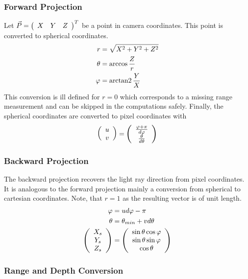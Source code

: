 \subsubsection*{Forward Projection}

Let $\vec{P} = \left(\begin{array}{ccc} X & Y & Z \end{array}\right)^T$ be a point in camera coordinates.
This point is converted to spherical coordinates.
\begin{equation}
\begin{aligned}
    r      &= \sqrt{X^2 + Y^2 + Z^2} \\
    \theta &= \arccos{\frac{Z}{r}} \\
    \varphi   &= \operatorname{arctan2}{\frac{Y}{X}}
\end{aligned}
\end{equation}
This conversion is ill defined for $r = 0$ which corresponds to a missing range measurement and can be skipped in the computations safely.
Finally, the spherical coordinates are converted to pixel coordinates with
\begin{equation}
\begin{aligned} 
    \left(\begin{array}{c} u \\ v \end{array}\right) = \left(\begin{array}{c} \frac{\varphi + \pi}{d\varphi} \\ \frac{\theta}{d\theta} \end{array}\right)
\end{aligned}
\end{equation}

\subsubsection*{Backward Projection}

The backward projection recovers the light ray direction from pixel coordinates.
It is analogous to the forward projection mainly a conversion from spherical to cartesian coordinates.
Note, that $r = 1$ as the resulting vector is of unit length.
\begin{equation}
\begin{aligned}
    \varphi &= u d\varphi - \pi \\
    \theta &= \theta_{min} + v d\theta \\
    \left(\begin{array}{c} X_s \\ Y_s \\ Z_s \end{array}\right) &= \left(\begin{array}{c} \sin \theta \cos \varphi \\ \sin \theta \sin \varphi \\ \cos \theta \end{array}\right)
\end{aligned}
\end{equation}

\subsubsection{Range and Depth Conversion}

